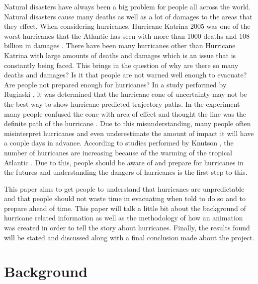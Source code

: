
Natural disasters have always been a big problem for people all across the world. Natural disasters cause many deaths as well as a lot of damages to the areas that they effect. When considering hurricanes, Hurricane Katrina 2005 was one of the worst hurricanes that the Atlantic has seen with more than 1000 deaths and 108 billion in damages \cite{blake2011deadliest}. There have been many hurricanes other than Hurricane Katrina with large amounts of deaths and damages which is an issue that is constantly being faced. This brings in the question of why are there so many deaths and damages? Is it that people are not warned well enough to evacuate? Are people not prepared enough for hurricanes? In a study performed by Ruginski \etal, it was determined that the hurricane cone of uncertainty may not be the best way to show hurricane predicted trajectory paths. In the experiment many people confused the cone with area of effect and thought the line was the definite path of the hurricane \cite{ruginski2016non}. Due to this misunderstanding, many people often misinterpret hurricanes and even underestimate the amount of impact it will have a couple days in advance. According to studies performed by Knutson \etal, the number of hurricanes are increasing because of the warming of the tropical Atlantic \cite{knutson2008simulated}. Due to this, people should be aware of and prepare for hurricanes in the futures and understanding the dangers of hurricanes is the first step to this.

This paper aims to get people to understand that hurricanes are unpredictable and that people should not waste time in evacuating when told to do so and to prepare ahead of time. This paper will talk a little bit about the background of hurricane related information as well as the methodology of how an animation was created in order to tell the story about hurricanes. Finally, the results found will be stated and discussed along with a final conclusion made about the project.

\section{Background}

